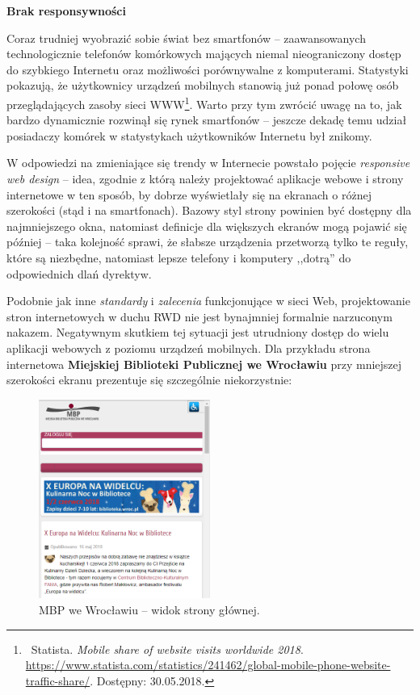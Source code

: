 \documentclass[12pt, a4paper]{article}
\begin{document}
\noindent\textbf{Brak responsywności}\\\vspace{-0.35cm}

Coraz trudniej wyobrazić sobie świat bez smartfonów -- zaawansowanych technologicznie telefonów komórkowych mających niemal nieograniczony dostęp do szybkiego Internetu oraz możliwości porównywalne z komputerami. Statystyki pokazują, że użytkownicy urządzeń mobilnych stanowią już ponad połowę osób przeglądających zasoby sieci WWW\footnote{\ Statista. \textit{Mobile share of website visits worldwide 2018}. \url{https://www.statista.com/statistics/241462/global-mobile-phone-website-traffic-share/}. Dostępny: 30.05.2018.}. Warto przy tym zwrócić uwagę na to, jak bardzo dynamicznie rozwinął się rynek smartfonów -- jeszcze dekadę temu udział posiadaczy komórek w statystykach użytkowników Internetu był znikomy.

W odpowiedzi na zmieniające się trendy w Internecie powstało pojęcie \textit{responsive web design} -- idea, zgodnie z którą należy projektować aplikacje webowe i strony internetowe w ten sposób, by dobrze wyświetlały się na ekranach o różnej szerokości (stąd i na smartfonach). Bazowy styl strony powinien być dostępny dla najmniejszego okna, natomiast definicje dla większych ekranów mogą pojawić się później -- taka kolejność sprawi, że słabsze urządzenia przetworzą tylko te reguły, które są niezbędne, natomiast lepsze telefony i komputery ,,dotrą'' do odpowiednich dlań dyrektyw.
 
Podobnie jak inne \textit{standardy} i \textit{zalecenia} funkcjonujące w sieci Web, projektowanie stron internetowych w duchu RWD nie jest bynajmniej formalnie narzuconym nakazem. Negatywnym skutkiem tej sytuacji jest utrudniony dostęp do wielu aplikacji webowych z poziomu urządzeń mobilnych. Dla przykładu strona internetowa \textbf{Miejskiej Biblioteki Publicznej we Wrocławiu} przy mniejszej szerokości ekranu prezentuje się szczególnie niekorzystnie:

\begin{figure}[h]
    \centering
    \includegraphics[width=0.5\textwidth]{img/mbp.png}
    \caption{MBP we Wrocławiu -- widok strony głównej.}
\end{figure}
\end{document}
